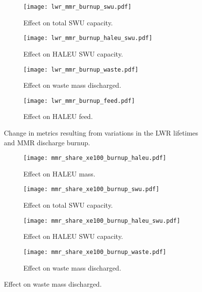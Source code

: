 \begin{figure}
    \ContinuedFloat    
    \begin{subfigure}[b]{0.48\textwidth}
        \centering
        \texttt{[image: lwr\_mmr\_burnup\_swu.pdf]}
        \caption{Effect on total SWU capacity.}
        \label{fig:lwr_mmr_burnup_swu}
    \end{subfigure}
    \hfill
    \begin{subfigure}[b]{0.48\textwidth}
        \centering
        \texttt{[image: lwr\_mmr\_burnup\_haleu\_swu.pdf]}
        \caption{Effect on HALEU SWU capacity.}
        \label{fig:lwr_mmr_burnup_haleu_swu}
    \end{subfigure}
    
    \begin{subfigure}[b]{0.48\textwidth}
        \centering
        \texttt{[image: lwr\_mmr\_burnup\_waste.pdf]}
        \caption{Effect on waste mass discharged.}
        \label{fig:lwr_mmr_burnup_waste}
    \end{subfigure}
    \hfill
    \begin{subfigure}[b]{0.48\textwidth}
        \centering
        \texttt{[image: lwr\_mmr\_burnup\_feed.pdf]}
        \caption{Effect on HALEU feed.}
        \label{fig:lwr_mmr_burnup_feed}
    \end{subfigure}
    \caption{Change in metrics resulting from variations in the 
    LWR lifetimes and MMR discharge burnup.}
    \label{fig:lwr_mmr_burnup}
\end{figure}

\begin{figure}
    \begin{subfigure}[b]{0.48\textwidth}
        \centering
        \texttt{[image: mmr\_share\_xe100\_burnup\_haleu.pdf]}
        \caption{Effect on HALEU mass.}
        \label{fig:mmr_share_xe100_burnup_haleu}
    \end{subfigure}
    \hfill 
    \begin{subfigure}[b]{0.48\textwidth}
        \centering
        \texttt{[image: mmr\_share\_xe100\_burnup\_swu.pdf]}
        \caption{Effect on total SWU capacity.}
        \label{fig:mmr_share_xe100_burnup_swu}
    \end{subfigure}
    \hfill
    \begin{subfigure}[b]{0.48\textwidth}
        \centering
        \texttt{[image: mmr\_share\_xe100\_burnup\_haleu\_swu.pdf]}
        \caption{Effect on HALEU SWU capacity.}
        \label{fig:mmr_share_xe100_burnup_haleu_swu}
    \end{subfigure}
    \hfill
    \begin{subfigure}[b]{0.48\textwidth}
        \centering
        \texttt{[image: mmr\_share\_xe100\_burnup\_waste.pdf]}
        \caption{Effect on waste mass discharged.}
        \label{fig:mmr_share_xe100_burnup_waste}
    \end{subfigure}
\end{figure}

